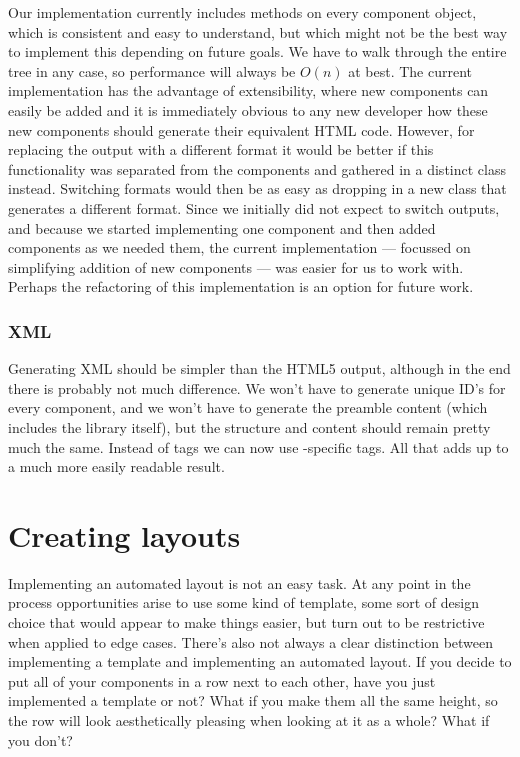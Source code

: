      Our implementation currently includes  methods on every
     component object, which is consistent and easy to understand, but which
     might not be the best way to implement this depending on future goals. We
     have to walk through the entire tree in any case, so performance will
     always be $O(n)$ at best. The current implementation has the advantage of
     extensibility, where new components can easily be added and it is
     immediately obvious to any new developer how these new components should
     generate their equivalent HTML code. However, for replacing the output
     with a different format it would be better if this functionality was
     separated from the components and gathered in a distinct 
     class instead. Switching formats would then be as easy as dropping in a
     new  class that generates a different format. Since we
     initially did not expect to switch outputs, and because we started
     implementing one component and then added components as we needed them,
     the current implementation --- focussed on simplifying addition of new
     components --- was easier for us to work with. Perhaps the refactoring of
     this implementation is an option for future work.


    \subsubsection{\mxp XML}

     Generating \mxp XML should be simpler than the HTML5 output, although in
     the end there is probably not much difference. We won't have to generate
     unique ID's for every component, and we won't have to generate the
     preamble content (which includes the \mxp library itself), but the
     structure and content should remain pretty much the same. Instead of
      tags we can now use \mxp-specific tags. All that adds up to a
     much more easily readable result.


  \section{Creating layouts}

   Implementing an automated layout is not an easy task. At any point in the
   process opportunities arise to use some kind of template, some sort of
   design choice that would appear to make things easier, but turn out to be
   restrictive when applied to edge cases. There's also not always a clear
   distinction between implementing a template and implementing an automated
   layout. If you decide to put all of your components in a row next to each
   other, have you just implemented a template or not? What if you make them
   all the same height, so the row will look aesthetically pleasing when
   looking at it as a whole? What if you don't?

